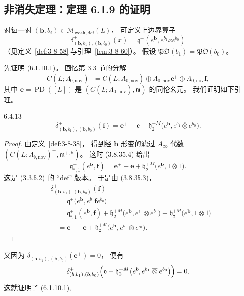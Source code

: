 
\subsection{非消失定理：定理 6.1.9 的证明}
\label{subsec:6-4-3}

对每一对
$(\boldsymbol b,b_i)
\in\mathcal M_{\mathrm{weak,def}}(L)$，
可定义上边界算子
\[
\delta^+_{(\boldsymbol b,b_1),(\boldsymbol b,b_0)}(x)
=\mathfrak q^+(e^{\boldsymbol b},e^{b_1}xe^{b_0})
\]
（见定义~\ref{def:3-8-58}
与引理~\ref{lem:3-8-60}）。
假设
$\mathfrak{PO}(b_1)=\mathfrak{PO}(b_0)$。

先证明 (6.1.10.1)。
回忆第 3.3 节的分解
\[
C(L;\Lambda_{0,\mathrm{nov}})^+
=C(L;\Lambda_{0,\mathrm{nov}})
\oplus\Lambda_{0,\mathrm{nov}}\mathbf e^+
\oplus\Lambda_{0,\mathrm{nov}}\mathbf f,
\]
其中
$\mathbf e=\operatorname{PD}([L])$
是 $(C(L;\Lambda_{0,\mathrm{nov}}),\mathfrak m)$
的同伦幺元。
\pagebreak
我们证明如下引理。

\begin{lemma}{6.4.13}\label{lem:6-4-13}
\[
\delta^+_{(\boldsymbol b,b_1),(\boldsymbol b,b_0)}(\mathbf f)
=\mathbf e^+-\mathbf e
+\mathfrak h_2^{+M}
\bigl(e^{\boldsymbol b},
e^{b_1}\mathbin{\overline\otimes}e^{b_0}\bigr).
\]
\end{lemma}

\begin{proof}
由定义~\ref{def:3-8-38}，
得到经 $\boldsymbol b$ 形变的滤过
$A_\infty$ 代数
$(C(L;\Lambda_{0,\mathrm{nov}})^+,
\mathfrak m^{+,\boldsymbol b})$。
这时 (3.8.35.4) 给出
\[
\mathfrak q_{*,1}^+(e^{\boldsymbol b},\mathbf f)
=\mathbf e^+-\mathbf e
+\mathfrak h_2^{+M}
\bigl(e^{\boldsymbol b},
1\mathbin{\overline\otimes}1\bigr).
\]
这是 (3.3.5.2) 的 ``def'' 版本。
于是由 (3.8.35.3)，
\[
\begin{aligned}
&\delta^+_{(\boldsymbol b,b_1),(\boldsymbol b,b_0)}(\mathbf f)\\
&\quad=\mathfrak q^+
\bigl(e^{\boldsymbol b},e^{b_1}\mathbf f e^{b_0}\bigr)\\
&\quad=\mathfrak q_{*,1}^+(e^{\boldsymbol b},\mathbf f)
+\mathfrak h_2^{+M}
\bigl(e^{\boldsymbol b},
e^{b_1}\mathbin{\overline\otimes}e^{b_0}\bigr)
-\mathfrak h_2^{+M}
\bigl(e^{\boldsymbol b},
1\mathbin{\overline\otimes}1\bigr)\\
&\quad=\mathbf e^+-\mathbf e
+\mathfrak h_2^{+M}
\bigl(e^{\boldsymbol b},
e^{b_1}\mathbin{\overline\otimes}e^{b_0}\bigr).
\end{aligned}
\]
\end{proof}

又因为
$\delta^+_{(\boldsymbol b,b_1),(\boldsymbol b,b_0)}
(\mathbf e^+)=0$，
便有
\[
\delta^+_{(\boldsymbol b,b_1),(\boldsymbol b,b_0)}
\Bigl(
\mathbf e-
\mathfrak h_2^{+M}
\bigl(e^{\boldsymbol b},
e^{b_1}\mathbin{\overline\otimes}e^{b_0}\bigr)
\Bigr)=0.
\]
这就证明了 (6.1.10.1)。

